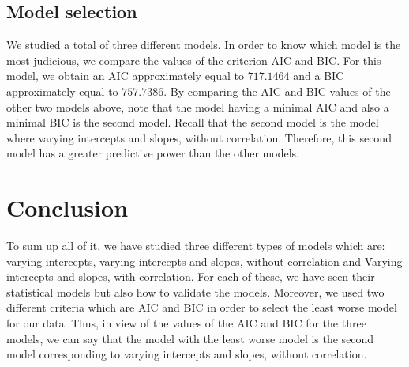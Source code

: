 \documentclass{article}
\begin{document}
\subsection{Model selection}
We studied a total of three different models. In order to know which model is the most judicious, we compare the values of the criterion AIC and BIC.
For this model, we obtain an AIC approximately equal to $717.1464$ and a BIC approximately equal to $757.7386$. By comparing the AIC and BIC values of the other two models above, note that the model having a minimal AIC and also a minimal BIC is the second model. Recall that the second model is the model where varying intercepts and slopes, without correlation. Therefore, this second model has a greater predictive power than the other models.


\section*{Conclusion}
To sum up all of it, we have studied three different types of models which are:
varying intercepts, varying intercepts and slopes, without correlation and Varying intercepts and slopes, with correlation. 
For each of these, we have seen their statistical models but also how to validate the models. Moreover, we used two different criteria which are AIC and BIC in order to select the least worse model for our data. Thus, in view of the values of the AIC and BIC for the three models, we can say that the model with the least worse model is the second model  corresponding to varying intercepts and slopes, without correlation.


\nocite{*}
\printbibliography
\end{document}
